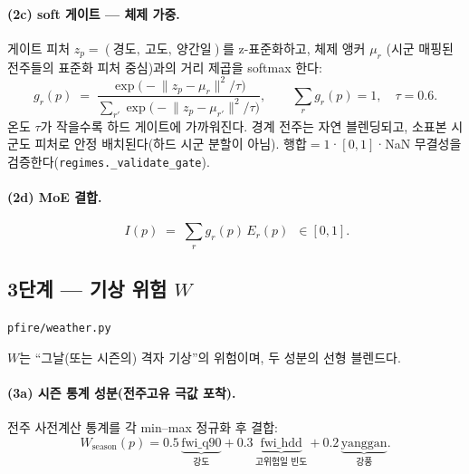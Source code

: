 \documentclass[11pt,a4paper]{article}
\newcommand{\src}[1]{{\footnotesize\color{gray}\texttt{#1}}}
\begin{document}
\paragraph{(2c) soft 게이트 — 체제 가중.}
게이트 피처 $z_p=(\text{경도},\ \text{고도},\ \text{양간일})$를 z-표준화하고, 체제 앵커 $\mu_r$
(시군 매핑된 전주들의 표준화 피처 중심)과의 거리 제곱을 softmax 한다:
\begin{equation}
g_r(p)\;=\;\frac{\exp\!\big(-\lVert z_p-\mu_r\rVert^2/\tau\big)}
{\sum_{r'}\exp\!\big(-\lVert z_p-\mu_{r'}\rVert^2/\tau\big)},
\qquad \textstyle\sum_r g_r(p)=1,\quad \tau=0.6.
\label{eq:gate}
\end{equation}
온도 $\tau$가 작을수록 하드 게이트에 가까워진다. 경계 전주는 자연 블렌딩되고, 소표본 시군도 피처로
안정 배치된다(하드 시군 분할이 아님). 행합$=1$·$[0,1]$·NaN 무결성을 검증한다(\src{regimes.\_validate\_gate}).

\paragraph{(2d) MoE 결합.}
\begin{equation}
\boxed{\;I(p)\;=\;\sum_{r} g_r(p)\,E_r(p)\;}\ \in[0,1].
\label{eq:moe}
\end{equation}

\subsection{3단계 — 기상 위험 $W$}\label{sec:weather}
\src{pfire/weather.py}

$W$는 ``그날(또는 시즌의) 격자 기상''의 위험이며, 두 성분의 선형 블렌드다.

\paragraph{(3a) 시즌 통계 성분(전주고유 극값 포착).}
전주 사전계산 통계를 각 min--max 정규화 후 결합:
\begin{equation}
W_{\text{season}}(p)=0.5\,\underbrace{\mathrm{fwi\_q90}}_{\text{강도}}
+0.3\,\underbrace{\mathrm{fwi\_hdd}}_{\text{고위험일 빈도}}
+0.2\,\underbrace{\mathrm{yanggan}}_{\text{강풍}}.
\label{eq:wseason}
\end{equation}
\end{document}
